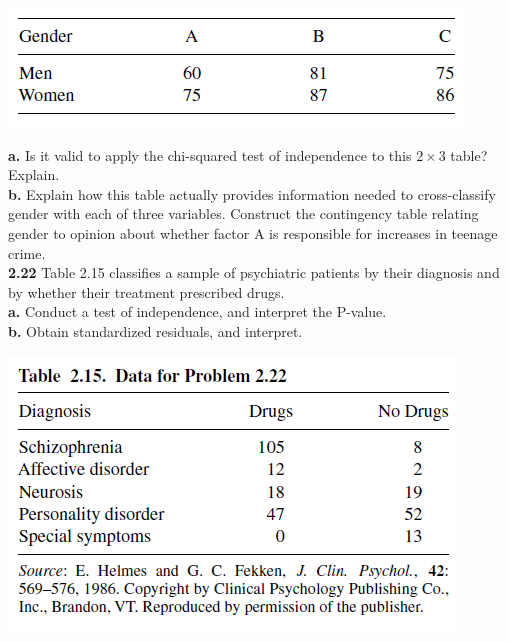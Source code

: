 \documentclass[paper=letter, fontsize=11pt]{scrartcl} %
\begin{document}
\begin{center}
	\includegraphics[scale=.80]{contTable221.png}
\end{center}

\textbf{a.} Is it valid to apply the chi-squared test of independence to this $2 \times 3$
table? Explain. \\

\textbf{b.} Explain how this table actually provides information needed to cross-classify
gender with each of three variables. Construct the contingency table relating gender to
opinion about whether factor A is responsible for increases in teenage crime. \\

\textbf{2.22} Table 2.15 classifies a sample of psychiatric patients by their diagnosis
and by whether their treatment prescribed drugs. \\

\textbf{a.} Conduct a test of independence, and interpret the P-value. \\

\textbf{b.} Obtain standardized residuals, and interpret. \\

\begin{center}
	\includegraphics[scale=.80]{table215.png}
\end{center}
\end{document}
